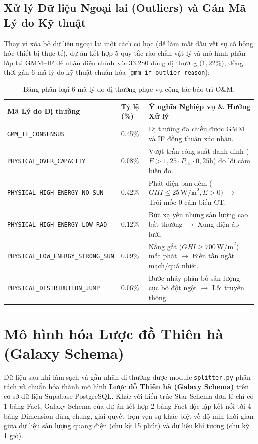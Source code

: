 \documentclass[12pt, a4paper]{report}
\begin{document}
\subsection{Xử lý Dữ liệu Ngoại lai (Outliers) và Gán Mã Lý do Kỹ thuật}
Thay vì xóa bỏ dữ liệu ngoại lai một cách cơ học (dễ làm mất dấu vết sự cố hỏng hóc thiết bị thực tế), dự án kết hợp 5 quy tắc rào chắn vật lý và mô hình phân lớp lai GMM--IF để nhận diện chính xác $33.280$ dòng dị thường ($1{,}22\%$), đồng thời gán 6 mã lý do kỹ thuật chuẩn hóa (\texttt{gmm\_if\_outlier\_reason}):

\begin{table}[H]
\centering
\small
\renewcommand{\arraystretch}{1.25}
\begin{tabularx}{\textwidth}{@{} l l X @{}}
\toprule
\textbf{Mã Lý do Dị thường} & \textbf{Tỷ lệ (\%)} & \textbf{Ý nghĩa Nghiệp vụ \& Hướng Xử lý} \\
\midrule
\texttt{GMM\_IF\_CONSENSUS} & 0.45\% & Dị thường đa chiều được GMM và IF đồng thuận xác nhận. \\
\texttt{PHYSICAL\_OVER\_CAPACITY} & 0.08\% & Vượt trần công suất danh định ($E > 1{,}25 \cdot P_{\text{stc}} \cdot 0{,}25\text{h}$) do lỗi cảm biến đo. \\
\texttt{PHYSICAL\_HIGH\_ENERGY\_NO\_SUN} & 0.42\% & Phát điện ban đêm ($GHI \le 25\,\text{W/m}^2, E > 0$) $\rightarrow$ Trôi mốc 0 cảm biến CT. \\
\texttt{PHYSICAL\_HIGH\_ENERGY\_LOW\_RAD} & 0.12\% & Bức xạ yếu nhưng sản lượng cao bất thường $\rightarrow$ Xung điện áp lưới. \\
\texttt{PHYSICAL\_LOW\_ENERGY\_STRONG\_SUN} & 0.09\% & Nắng gắt ($GHI \ge 700\,\text{W/m}^2$) mất phát $\rightarrow$ Biến tần ngắt mạch/quá nhiệt. \\
\texttt{PHYSICAL\_DISTRIBUTION\_JUMP} & 0.06\% & Bước nhảy phân bố sản lượng cục bộ đột ngột $\rightarrow$ Lỗi truyền thông. \\
\bottomrule
\end{tabularx}
\caption{Bảng phân loại 6 mã lý do dị thường phục vụ công tác bảo trì O\&M.}
\label{tab:outlier_reasons}
\end{table}

\section{Mô hình hóa Lược đồ Thiên hà (Galaxy Schema)}
\label{sec:galaxy_modeling}

Dữ liệu sau khi làm sạch và gắn nhãn dị thường được module \texttt{splitter.py} phân tách và chuẩn hóa thành mô hình \textbf{Lược đồ Thiên hà (Galaxy Schema)} trên cơ sở dữ liệu Supabase PostgreSQL. Khác với kiến trúc Star Schema đơn lẻ chỉ có 1 bảng Fact, Galaxy Schema của dự án kết hợp 2 bảng Fact độc lập kết nối tới 4 bảng Dimension dùng chung, giải quyết trọn vẹn sự khác biệt về độ mịn thời gian giữa dữ liệu sản lượng quang điện (chu kỳ 15 phút) và dữ liệu khí tượng (chu kỳ 1 giờ).
\end{document}
